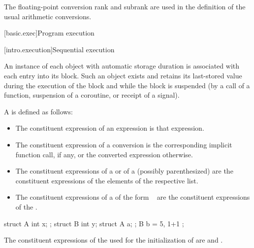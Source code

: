 \pnum
\begin{note}
The floating-point conversion rank and subrank are used in
the definition of the usual arithmetic conversions.
\end{note}

[basic.exec]{Program execution}

[intro.execution]{Sequential execution}

\pnum
An instance of each object with automatic storage
duration is associated with each entry into its
block. Such an object exists and retains its last-stored value during
the execution of the block and while the block is suspended (by a call
of a function, suspension of a coroutine, or receipt of a signal).

\pnum
A  is defined as follows:
\begin{itemize}
\item
The constituent expression of an expression is that expression.
\item
The constituent expression of a conversion is
the corresponding implicit function call, if any, or
the converted expression otherwise.
\item
The constituent expressions of a  or
of a (possibly parenthesized) 
are the constituent expressions of the elements of the respective list.
\item
The constituent expressions of a 
of the form \tcode{=}~
are the constituent expressions of the .
\end{itemize}
\begin{example}
\begin{codeblock}
struct A { int x; };
struct B { int y; struct A a; };
B b = { 5, { 1+1 } };
\end{codeblock}
The constituent expressions of the 
used for the initialization of  are  and .
\end{example}


